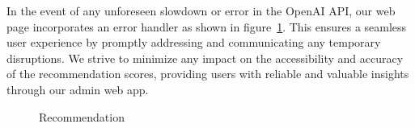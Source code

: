 In the event of any unforeseen slowdown or error in the OpenAI API, our web page incorporates an error handler as shown in figure~\ref{fig:recommend}. This ensures a seamless user experience by promptly addressing and communicating any temporary disruptions. We strive to minimize any impact on the accessibility and accuracy of the recommendation scores, providing users with reliable and valuable insights through our admin web app.
   \begin{figure}[H]
	\centering
	\hspace{5pt}
	\caption{Recommendation}
	\label{fig:recommend}
\end{figure}
